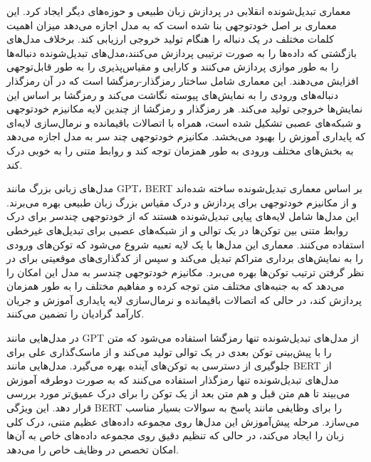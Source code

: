 


معماری تبدیل‌شونده انقلابی در پردازش زبان طبیعی و حوزه‌های دیگر ایجاد کرد. این معماری بر اصل خودتوجهی بنا شده است که به مدل اجازه می‌دهد میزان اهمیت کلمات مختلف در یک دنباله را هنگام تولید خروجی ارزیابی کند. برخلاف مدل‌های بازگشتی که داده‌ها را به صورت ترتیبی پردازش می‌کنند،مدل‌های تبدیل‌شونده دنباله‌ها را به طور موازی پردازش می‌کنند و کارایی و مقیاس‌پذیری را به طور قابل‌توجهی افزایش می‌دهند. این معماری شامل ساختار رمز‌گذار-رمزگشا است که در آن رمزگذار دنباله‌های ورودی را به نمایش‌های پیوسته نگاشت می‌کند و رمزگشا بر اساس این نمایش‌ها خروجی تولید می‌کند. هر رمزگذار و رمزگشا از چندین لایه مکانیزم خودتوجهی و شبکه‌های عصبی تشکیل شده است، همراه با اتصالات باقیمانده و نرمال‌سازی لایه‌ای که پایداری آموزش را بهبود می‌بخشد. مکانیزم خودتوجهی چند سر به مدل اجازه می‌دهد به بخش‌های مختلف ورودی به طور همزمان توجه کند و روابط متنی را به خوبی درک کند.



مدل‌های زبانی بزرگ مانند GPT، BERT  بر اساس معماری تبدیل‌شونده ساخته شده‌اند و از مکانیزم خودتوجهی برای پردازش و درک مقیاس بزرگ زبان طبیعی بهره می‌برند. این مدل‌ها شامل لایه‌های پیاپی تبدیل‌شونده هستند که از خودتوجهی چندسر برای درک روابط متنی بین توکن‌ها در یک توالی و از شبکه‌های عصبی برای تبدیل‌های غیرخطی استفاده می‌کنند. معماری این مدل‌ها با یک لایه تعبیه شروع می‌شود که توکن‌های ورودی را به نمایش‌های برداری متراکم تبدیل می‌کند و سپس از کدگذاری‌های موقعیتی برای در نظر گرفتن ترتیب توکن‌ها بهره می‌برد. مکانیزم خودتوجهی چندسر به مدل این امکان را می‌دهد که به جنبه‌های مختلف متن توجه کرده و مفاهیم مختلف را به طور همزمان پردازش کند، در حالی که اتصالات باقیمانده و نرمال‌سازی لایه پایداری آموزش و جریان کارآمد گرادیان را تضمین می‌کنند.

در مدل‌هایی مانند GPT از مدل‌های تبدیل‌شونده تنها رمزگشا استفاده می‌شود که متن را با پیش‌بینی توکن بعدی در یک توالی تولید می‌کند و از ماسک‌گذاری علی برای جلوگیری از دسترسی به توکن‌های آینده بهره می‌گیرد. مدل‌هایی مانند BERT از مدل‌های تبدیل‌شونده تنها رمزگذار استفاده می‌کنند که به صورت دوطرفه آموزش می‌بیند تا هم متن قبل و هم متن بعد از یک توکن را برای درک عمیق‌تر مورد بررسی قرار دهد. این ویژگی BERT را برای وظایفی مانند پاسخ به سوالات بسیار مناسب می‌سازد. مرحله پیش‌آموزش این مدل‌ها روی مجموعه داده‌های عظیم متنی، درک کلی زبان را ایجاد می‌کند، در حالی که تنظیم دقیق روی مجموعه داده‌های خاص به آن‌ها امکان تخصص در وظایف خاص را می‌دهد.

